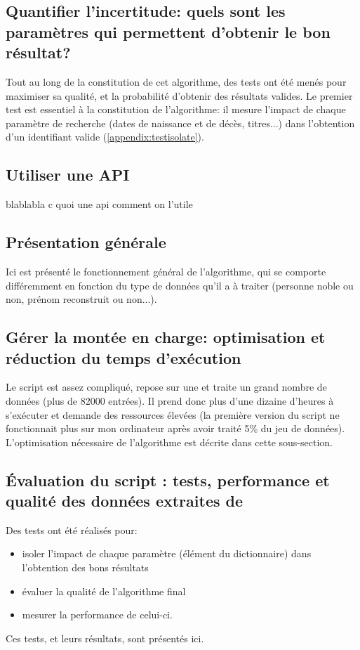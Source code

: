 

\subsection{Quantifier l'incertitude: quels sont les paramètres qui permettent d'obtenir le bon résultat?}
Tout au long de la constitution de cet algorithme, des tests ont été menés pour maximiser sa qualité, et la probabilité d'obtenir des résultats valides. Le premier test est essentiel à la constitution de l'algorithme: il mesure l'impact de chaque paramètre de recherche (dates de naissance et de décès, titres...) dans l'obtention d'un identifiant valide (\ref{appendix:testisolate}).

\subsection{Utiliser une API}
blablabla c quoi une api comment on l'utile

\subsection{Présentation générale}
Ici est présenté le fonctionnement général de l'algorithme, qui se comporte différemment en fonction du type de données qu'il a à traiter (personne noble ou non, prénom reconstruit ou non...).

\subsection{Gérer la montée en charge: optimisation et réduction du temps d'exécution}
Le script est assez compliqué, repose sur une \api{} et traite un grand nombre de données (plus de 82000 entrées). Il prend donc plus d'une dizaine d'heures à s'exécuter et demande des ressources élevées (la première version du script ne fonctionnait plus sur mon ordinateur après avoir traité 5\% du jeu de données). L'optimisation nécessaire de l'algorithme est décrite dans cette sous-section.

\subsection{Évaluation du script : tests, performance et qualité des données extraites de \wkd{}}
Des tests ont été réalisés pour:
\begin{itemize}
	\item isoler l'impact de chaque paramètre (élément du dictionnaire) dans l'obtention des bons résultats
	\item évaluer la qualité de l'algorithme final
	\item mesurer la performance de celui-ci.
\end{itemize}
Ces tests, et leurs résultats, sont présentés ici.

